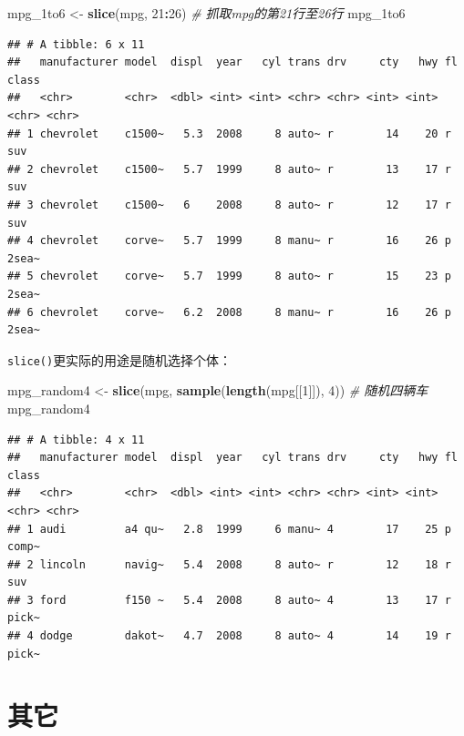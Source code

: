 \documentclass[]{book}
\newenvironment{Shaded}{\begin{snugshade}}{\end{snugshade}}
\newcommand{\CommentTok}[1]{\textcolor[rgb]{0.56,0.35,0.01}{\textit{#1}}}
\newcommand{\DecValTok}[1]{\textcolor[rgb]{0.00,0.00,0.81}{#1}}
\newcommand{\KeywordTok}[1]{\textcolor[rgb]{0.13,0.29,0.53}{\textbf{#1}}}
\newcommand{\NormalTok}[1]{#1}
\newcommand{\OperatorTok}[1]{\textcolor[rgb]{0.81,0.36,0.00}{\textbf{#1}}}
\newcommand{\StringTok}[1]{\textcolor[rgb]{0.31,0.60,0.02}{#1}}
\begin{document}
\begin{Shaded}
\begin{Highlighting}[]
\NormalTok{mpg_1to6 <-}\StringTok{ }\KeywordTok{slice}\NormalTok{(mpg, }\DecValTok{21}\OperatorTok{:}\DecValTok{26}\NormalTok{) }\CommentTok{# 抓取mpg的第21行至26行}
\NormalTok{mpg_1to6}
\end{Highlighting}
\end{Shaded}

\begin{verbatim}
## # A tibble: 6 x 11
##   manufacturer model  displ  year   cyl trans drv     cty   hwy fl    class
##   <chr>        <chr>  <dbl> <int> <int> <chr> <chr> <int> <int> <chr> <chr>
## 1 chevrolet    c1500~   5.3  2008     8 auto~ r        14    20 r     suv  
## 2 chevrolet    c1500~   5.7  1999     8 auto~ r        13    17 r     suv  
## 3 chevrolet    c1500~   6    2008     8 auto~ r        12    17 r     suv  
## 4 chevrolet    corve~   5.7  1999     8 manu~ r        16    26 p     2sea~
## 5 chevrolet    corve~   5.7  1999     8 auto~ r        15    23 p     2sea~
## 6 chevrolet    corve~   6.2  2008     8 manu~ r        16    26 p     2sea~
\end{verbatim}

\texttt{slice()}更实际的用途是随机选择个体：

\begin{Shaded}
\begin{Highlighting}[]
\NormalTok{mpg_random4 <-}\StringTok{ }\KeywordTok{slice}\NormalTok{(mpg, }\KeywordTok{sample}\NormalTok{(}\KeywordTok{length}\NormalTok{(mpg[[}\DecValTok{1}\NormalTok{]]), }\DecValTok{4}\NormalTok{)) }\CommentTok{# 随机四辆车}
\NormalTok{mpg_random4}
\end{Highlighting}
\end{Shaded}

\begin{verbatim}
## # A tibble: 4 x 11
##   manufacturer model  displ  year   cyl trans drv     cty   hwy fl    class
##   <chr>        <chr>  <dbl> <int> <int> <chr> <chr> <int> <int> <chr> <chr>
## 1 audi         a4 qu~   2.8  1999     6 manu~ 4        17    25 p     comp~
## 2 lincoln      navig~   5.4  2008     8 auto~ r        12    18 r     suv  
## 3 ford         f150 ~   5.4  2008     8 auto~ 4        13    17 r     pick~
## 4 dodge        dakot~   4.7  2008     8 auto~ 4        14    19 r     pick~
\end{verbatim}

\hypertarget{tibble-misc}{%
\section{其它}\label{tibble-misc}}
\end{document}
